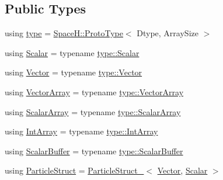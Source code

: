 \subsection*{Public Types}
\begin{DoxyCompactItemize}
\item 
using \mbox{\hyperlink{class_space_h_1_1_vel_indep_particles_a09aa167b5fb1b203ab021220601ed74c}{type}} = \mbox{\hyperlink{struct_space_h_1_1_proto_type}{Space\+H\+::\+Proto\+Type}}$<$ Dtype, Array\+Size $>$
\item 
using \mbox{\hyperlink{class_space_h_1_1_vel_indep_particles_aeb47d8131b30ed790320ff634f0d6af1}{Scalar}} = typename \mbox{\hyperlink{struct_space_h_1_1_proto_type_af3c8245d83d9db64749882920de5c274}{type\+::\+Scalar}}
\item 
using \mbox{\hyperlink{class_space_h_1_1_vel_indep_particles_a61bbcfdb0dc7f99f3c68af69a755c935}{Vector}} = typename \mbox{\hyperlink{struct_space_h_1_1_proto_type_a316b81f4660b2b4fab14a8e1f23b6089}{type\+::\+Vector}}
\item 
using \mbox{\hyperlink{class_space_h_1_1_vel_indep_particles_aa9983058940249df8b00fa800e8cbad2}{Vector\+Array}} = typename \mbox{\hyperlink{struct_space_h_1_1_proto_type_a622b8e122b33bb4966a02299fb7b82d6}{type\+::\+Vector\+Array}}
\item 
using \mbox{\hyperlink{class_space_h_1_1_vel_indep_particles_ab5efeef52fb5748c25fbfeb04b64640e}{Scalar\+Array}} = typename \mbox{\hyperlink{struct_space_h_1_1_proto_type_a09ef91dc8a37a044c403f5a833044725}{type\+::\+Scalar\+Array}}
\item 
using \mbox{\hyperlink{class_space_h_1_1_vel_indep_particles_abe09426d740c8c2425c5fc3789c9c744}{Int\+Array}} = typename \mbox{\hyperlink{struct_space_h_1_1_proto_type_ad9105b93d029a9d231bc31ddcfd7dbd9}{type\+::\+Int\+Array}}
\item 
using \mbox{\hyperlink{class_space_h_1_1_vel_indep_particles_abca40159a816385790d5a6fd19c1dc6d}{Scalar\+Buffer}} = typename \mbox{\hyperlink{struct_space_h_1_1_proto_type_a62c491884996da10377d348a5aabad86}{type\+::\+Scalar\+Buffer}}
\item 
using \mbox{\hyperlink{class_space_h_1_1_vel_indep_particles_ab20a7efcdf5e90bd1d073eb73be59120}{Particle\+Struct}} = \mbox{\hyperlink{struct_space_h_1_1_particle_struct__}{Particle\+Struct\+\_\+}}$<$ \mbox{\hyperlink{class_space_h_1_1_vel_indep_particles_a61bbcfdb0dc7f99f3c68af69a755c935}{Vector}}, \mbox{\hyperlink{class_space_h_1_1_vel_indep_particles_aeb47d8131b30ed790320ff634f0d6af1}{Scalar}} $>$
\end{DoxyCompactItemize}
